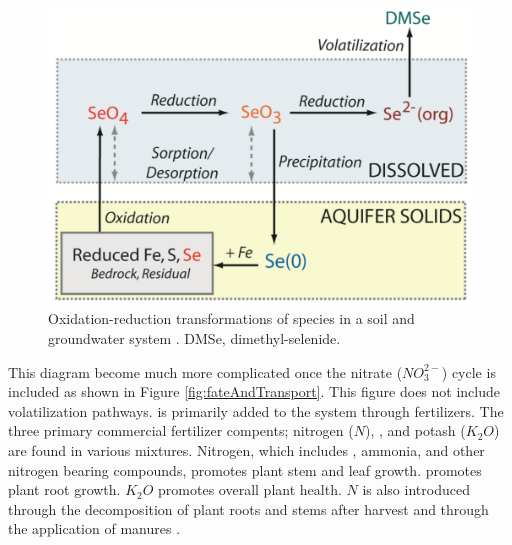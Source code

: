 \begin{figure}[!htbp]
	\centering
	\includegraphics[scale=.6]{"Figures/SeRedOx"}
	\caption[Oxidation-reduction transformations of \Se species in a soil and groundwater system.]{Oxidation-reduction transformations of \Se species in a soil and groundwater system  \parencite{Bailey2012}.  DMSe, dimethyl-selenide.}
	\label{fig:SeRedOx}
\end{figure}

This diagram become much more complicated once the nitrate ($ NO_3^{2-} $) cycle is included as shown in Figure \ref{fig:fateAndTransport}.  This figure does not include volatilization pathways.  \nitrate is primarily added to the system through fertilizers.  The three primary commercial fertilizer compents; nitrogen ($N$), \phosphate, and potash ($K_2O$) are found in various mixtures.  Nitrogen, which includes \nitrate, ammonia, and other nitrogen bearing compounds, promotes plant stem and leaf growth. \phosphate promotes plant root growth.  $K_2O$ promotes overall plant health.  $N$ is also introduced through the decomposition of plant roots and stems after harvest and through the application of manures \parencite{Bailey2012}. 

